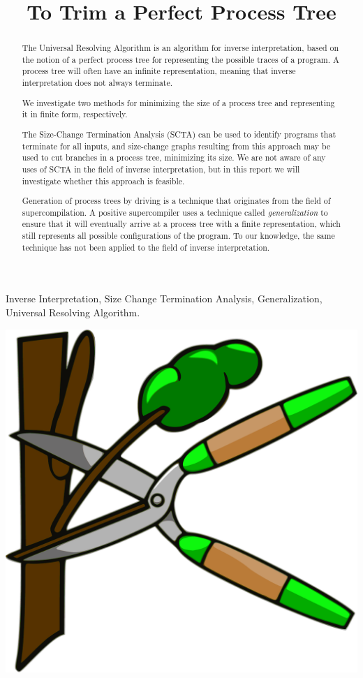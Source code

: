 \documentclass[10pt]{../sigplanconf}
\title{To Trim a Perfect Process Tree}
\begin{document}
\maketitle


\begin{abstract}
  The Universal Resolving Algorithm\cite{abramov2000universal} is an
  algorithm for inverse interpretation, based on the notion of a
  perfect process tree for representing the possible traces of a
  program. A process tree will often have an infinite representation,
  meaning that inverse interpretation does not always terminate.

  We investigate two methods for minimizing the size of a process tree
  and representing it in finite form, respectively.

  The Size-Change Termination Analysis (SCTA)\cite{lee2001size} can be
  used to identify programs that terminate for all inputs, and
  size-change graphs resulting from this approach may be used to cut
  branches in a process tree, minimizing its size. We are not aware of
  any uses of SCTA in the field of inverse interpretation, but in this
  report we will investigate whether this approach is feasible.

  Generation of process trees by driving is a technique that
  originates from the field of
  supercompilation\cite{sorensen1998introduction}. A positive
  supercompiler uses a technique called \emph{generalization} to
  ensure that it will eventually arrive at a process tree with a
  finite representation, which still represents all possible
  configurations of the program. To our knowledge, the same technique
  has not been applied to the field of inverse interpretation.
\end{abstract}

\keywords Inverse Interpretation, Size Change Termination Analysis,
Generalization, Universal Resolving Algorithm.

\newpage
\begin{center}
  \includegraphics[width=0.7\columnwidth]{../figures/pruning.pdf}
\end{center}
\end{document}
